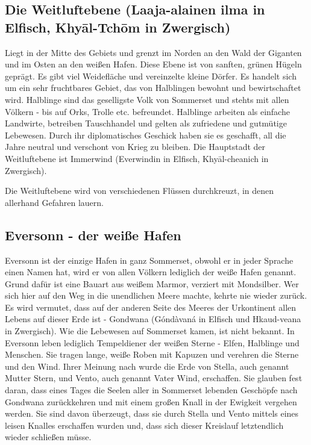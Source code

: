 \documentclass[11pt, twoside]{article}
\begin{document}
\subsection{Die Weitluftebene (Laaja-alainen ilma in Elfisch, Khyāl-Tchōm in Zwergisch)}
\label{sec:orgcf85c01}
Liegt in der Mitte des Gebiets und grenzt im Norden an den Wald der Giganten und im Osten an den weißen Hafen. Diese Ebene ist von sanften, grünen Hügeln geprägt. Es gibt viel Weidefläche und vereinzelte kleine Dörfer. Es handelt sich um ein sehr fruchtbares Gebiet, das von Halblingen bewohnt und bewirtschaftet wird. Halblinge sind das geselligste Volk von Sommerset und stehts mit allen Völkern - bis auf Orks, Trolle etc. befreundet. Halblinge arbeiten als einfache Landwirte, betreiben Tauschhandel und gelten als zufriedene und gutmütige Lebewesen. Durch ihr diplomatisches Geschick haben sie es geschafft, all die Jahre neutral und verschont von Krieg zu bleiben. Die Hauptstadt der Weitluftebene ist Immerwind (Everwindin in Elfisch, Khyāl-cheanich in Zwergisch).

Die Weitluftebene wird von verschiedenen Flüssen durchkreuzt, in denen allerhand Gefahren lauern.

\subsection{Eversonn - der weiße Hafen}
\label{sec:orgf84d1af}
Eversonn ist der einzige Hafen in ganz Sommerset, obwohl er in jeder Sprache einen Namen hat, wird er von allen Völkern lediglich der weiße Hafen genannt. Grund dafür ist eine Bauart aus weißem Marmor, verziert mit Mondsilber. Wer sich hier auf den Weg in die unendlichen Meere machte, kehrte nie wieder zurück. Es wird vermutet, dass auf der anderen Seite des Meeres der Urkontinent allen Lebens auf dieser Erde ist - Gondwana (Góndàvaná in Elfisch und Hkaud-veana in Zwergisch). Wie die Lebewesen auf Sommerset kamen, ist nicht bekannt. In Eversonn leben lediglich Tempeldiener der weißen Sterne - Elfen, Halblinge und Menschen. Sie tragen lange, weiße Roben mit Kapuzen und verehren die Sterne und den Wind. Ihrer Meinung nach wurde die Erde von Stella, auch genannt Mutter Stern, und Vento, auch genannt Vater Wind, erschaffen. Sie glauben fest daran, dass eines Tages die Seelen aller in Sommerset lebenden Geschöpfe nach Gondwana zurückkehren und mit einem großen Knall in der Ewigkeit vergehen werden. Sie sind davon überzeugt, dass sie durch Stella und Vento mittels eines leisen Knalles erschaffen wurden und, dass sich dieser Kreislauf letztendlich wieder schließen müsse.
\end{document}

